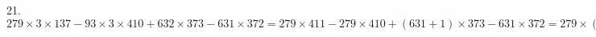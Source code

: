 21. $279\times3\times137-93\times3\times410+632\times373-631\times372=279\times411-279\times410+(631+1)\times373-631\times372=279\times(411-410)+631\times373+1\times373-
631\times372=279\times1+631\times(373-372)+373=279+631+373=1283.$\\
